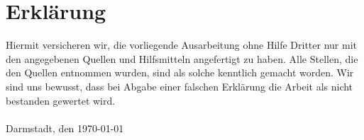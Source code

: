\section*{Erklärung}

Hiermit versicheren wir, die vorliegende Ausarbeitung ohne Hilfe Dritter nur mit den angegebenen Quellen und Hilfsmitteln angefertigt zu haben. Alle Stellen, die den Quellen entnommen wurden, sind als solche kenntlich gemacht worden. Wir sind uns bewusst, dass bei Abgabe einer falschen Erklärung die Arbeit als nicht bestanden gewertet wird. \\ \\

Darmstadt, den \today

%
%
%



